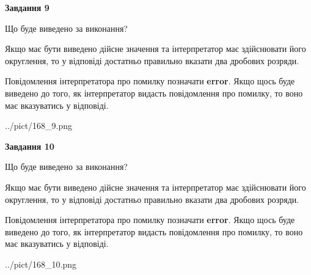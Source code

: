 \documentclass[12pt, ukrainian]{article}
\begin{document}
{\begin {Large}
{\begin {center}\textbf{Завдання 9}\end {center}}\par
Що буде виведено за виконання? \par

Якщо має бути виведено дійсне значення та інтерпретатор має здійснювати його округлення, 
то у відповіді достатньо правильно вказати два дробових розряди.

Повідомлення інтерпретатора про помилку позначати \textbf{error}.
Якщо щось буде виведено до того, як інтерпретатор видасть повідомлення про помилку, 
то воно має вказуватись у відповіді. \par

\begin{center}
	{../pict/168_9.png}
\end{center}
\newpage

{\begin {center}\textbf{Завдання 10}\end {center}}\par
Що буде виведено за виконання? \par

Якщо має бути виведено дійсне значення та інтерпретатор має здійснювати його округлення, 
то у відповіді достатньо правильно вказати два дробових розряди.

Повідомлення інтерпретатора про помилку позначати \textbf{error}.
Якщо щось буде виведено до того, як інтерпретатор видасть повідомлення про помилку, 
то воно має вказуватись у відповіді. \par

\begin{center}
	{../pict/168_10.png}
\end{center}
\newpage

\end {Large}}
\end{document}
